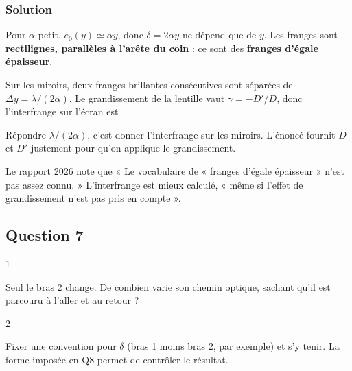 \documentclass[11pt,a4paper]{article}
\newcommand{\equationajustee}[1]{%
  \sbox{\boiteequation}{$\displaystyle #1$}%
  \ifdim\wd\boiteequation>\linewidth
    \[\resizebox{\linewidth}{!}{\usebox{\boiteequation}}\]%
  \else
    \[#1\]%
  \fi}
\begin{document}
\hypertarget{solution-5}{%
\subsubsection{Solution}\label{solution-5}}

Pour \(\alpha\) petit, \(e_0(y)\simeq\alpha y\), donc \(\delta=2\alpha y\) ne dépend que de \(y\). Les franges sont \textbf{rectilignes, parallèles à l'arête du coin} : ce sont des \textbf{franges d'égale épaisseur}.

Sur les miroirs, deux franges brillantes consécutives sont séparées de \(\Delta y=\lambda/(2\alpha)\). Le grandissement de la lentille vaut \(\gamma=-D'/D\), donc l'interfrange sur l'écran est
\equationajustee{\boxed{i_e=\frac{D'}{D}\cdot\frac{\lambda}{2\alpha}}}

\begin{piege}

Répondre \(\lambda/(2\alpha)\), c'est donner l'interfrange sur les miroirs. L'énoncé fournit \(D\) et \(D'\) justement pour qu'on applique le grandissement.

\end{piege}

\begin{jury}

Le rapport 2026 note que « Le vocabulaire de « franges d'égale épaisseur » n'est pas assez connu. » L'interfrange est mieux calculé, « même si l'effet de grandissement n'est pas pris en compte ».

\end{jury}

\hypertarget{question-7}{%
\subsection{Question 7}\label{question-7}}

\begin{indication}{1}

Seul le bras 2 change. De combien varie son chemin optique, sachant qu'il est parcouru à l'aller et au retour ?

\end{indication}

\begin{indication}{2}

Fixer une convention pour \(\delta\) (bras 1 moins bras 2, par exemple) et s'y tenir. La forme imposée en Q8 permet de contrôler le résultat.

\end{indication}
\end{document}
